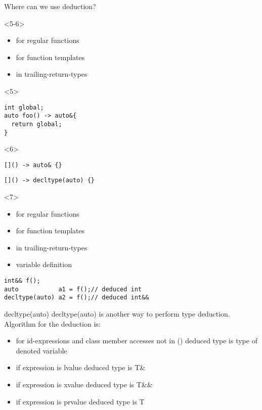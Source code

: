 \documentclass[10pt]{beamer}
\begin{document}
\begin{frame}[fragile]{Where can we use deduction?}
\begin{onlyenv}
	\end{onlyenv}


	\begin{onlyenv}<5-6>
		\begin{itemize}
			\item for regular functions
			\item for function templates
			\item \alert{in trailing-return-types}
		\end{itemize}

		\vfill
	\end{onlyenv}
	
	\begin{onlyenv}
	\begin{verbatim}
int global;	
auto foo() -> auto&{
  return global;
}		
		\end{verbatim}	
	\end{onlyenv}

	\begin{onlyenv}
	\begin{verbatim}
[]() -> auto& {}	
	\end{verbatim}
	\begin{verbatim}
[]() -> decltype(auto) {}	
	\end{verbatim}
	\end{onlyenv}

	\begin{onlyenv}
		\begin{itemize}
			\item for regular functions
			\item for function templates
			\item in trailing-return-types
			\item \alert{variable definition}
		\end{itemize}
	
		\begin{verbatim}
int&& f();
auto           a1 = f();// deduced int
decltype(auto) a2 = f();// deduced int&&		
		\end{verbatim}
	\end{onlyenv}

\end{frame}


\begin{frame}[fragile]{decltype(auto)}
	\centering \alert{decltype(auto)} is another way to perform type deduction. \\
	Algorithm for the deduction is:
	\begin{itemize}[<+- |alert@+>]
		\item for id-expressions and class member accesses not in () deduced type is type of denoted variable
		\item if expression is lvalue deduced type is T\&
		\item if expression is xvalue deduced type is T\&\&
		\item if expression is prvalue deduced type is T
	\end{itemize}
\end{frame}
\end{document}
